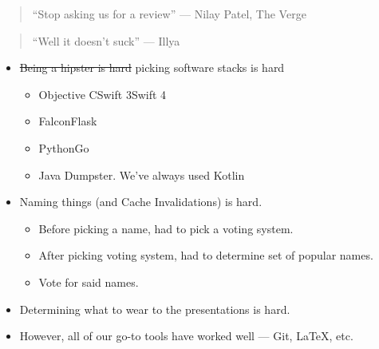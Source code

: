 \documentclass[handout,xclolor=dvipsnames]{beamer}    %
\begin{document}
\begin{darkframes}
\begin{frame}
        \begin{quote}
            ``Stop asking us for a review'' --- Nilay Patel, The Verge\pause{}
        \end{quote}

        \begin{quote}
            ``Well it doesn't suck'' --- Illya
        \end{quote}
    \end{frame}




    \begin{frame}
        \begin{itemize}
            \item \st{Being a hipster is hard} picking software stacks is hard\pause{}
                \begin{itemize}
                    \item Objective C\textrightarrow Swift 3\textrightarrow Swift 4\pause{}
                    \item Falcon\textrightarrow Flask\pause{}
                    \item Python\textrightarrow Go\pause{}
                    \item Java\textrightarrow\pause{} Dumpster. We've always used Kotlin\pause{}
                \end{itemize}

            \item Naming things (and Cache Invalidations) is hard.\pause{}
            \begin{itemize}
                \item Before picking a name, had to pick a voting system.
                \item After picking voting system, had to determine set of popular names.
                \item Vote for said names.
            \end{itemize}

            \item Determining what to wear to the presentations is hard.

            \item However, all of our go-to tools have worked well --- Git, \LaTeX{}, etc.
        \end{itemize}
    \end{frame}





\end{darkframes}
\end{document}
